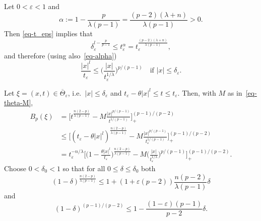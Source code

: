 \documentclass[a4paper, twoside]{article}
\makeatletter
\theoremstyle{propositional}
\theoremstyle{descriptive}
\renewenvironment{proof}[1][\proofname]{\par
  \pushQED{\qed}%
  \normalfont
  \trivlist
  \item[\hskip\labelsep
        \itshape
    #1\@addpunct{.}]\ignorespaces
}{%
  \popQED\endtrivlist\@endpefalse
}
\numberwithin{equation}{section}
\newcommand{\eps}{\varepsilon}
\newcommand{\al}{\alpha}
\newcommand{\de}{\delta}
\newcommand{\la}{\lambda}
\makeatother
\begin{document}
\begin{proof}
Let $0 <\eps<1$ and 
\begin{equation}   \label{eq-alpha}
\al := 1-\frac{p}{\la(p-1)} = \frac{(p-2)(\la+n)}{\la (p-1)} >0.
\end{equation}
Then \eqref{eq-t_eps} implies that
\begin{equation}    \label{eq-t-eps-de-eps}
\de_\eps^{l-\frac{p}{p-1}}
\le t_\eps^\al =  t_\eps^{\frac{(p-2)(\la+n)}{\la(p-1)}},
\end{equation}
and therefore (using also~\eqref{eq-alpha})
\begin{equation}   \label{eq-choose-small-|x|}
\frac{|x|^l}{t_\eps} 
\le \biggl( \frac{|x|}{t_\eps^{1/\la}} \biggr)^{p/(p-1)}
\quad \text{if } |x| \le \de_\eps.
\end{equation}

Let $\xi=(x,t)\in \overline{\Theta}_\eps$, i.e.\ $|x| \le \de_\eps$
and $t_\eps-\theta |x|^l\le t \le t_\eps$. 
Then, with $M$ as in~\eqref{eq-theta-M},
\begin{align}
B_p(\xi) & =  \biggl[ t^{\frac{n(2-p)}{\la (p-1)}} - M
\frac{|x|^{p/(p-1)}}{t^{1/(p-1)}}\biggr]_{+}^{(p-1)/(p-2)}  \nonumber\\
& \le  \biggl[ (t_\eps - \theta|x|^l)^{\frac{n(2-p)}{\la (p-1)}} - 
M \frac{|x|^{p/(p-1)}}{t_\eps^{1/(p-1)}}   \biggr]_{+}^{(p-1)/(p-2)} \nonumber  \\
&= t_\eps^{-n/\la} \biggl[ \biggl(1-\frac{\theta |x|^l}{t_\eps}\biggr)^{\frac{n(2-p)}{\la (p-1)}} 
  - M \biggl( \frac{|x|}{t_\eps^{1/\la}} \biggr)^{p/(p-1)}\biggr]_{+}^{(p-1)/(p-2)}.
\label{eq-Bp1}
\end{align}
Choose $0<\de_0<1$ so that for all $0\le \de \le \de_0$ both
\begin{equation} \label{eq-1}
(1-\de)^{\frac{n(2-p)}{\la (p-1)}} \le 1+(1+\eps(p-2))
\frac{n(p-2)}{\la (p-1)} \de
\end{equation}
and 
\begin{equation} \label{eq-2} 
(1-\de)^{(p-1)/(p-2)} \le 1-\frac{(1-\eps)(p-1)}{p-2} \de.
\end{equation}


\end{proof}
\end{document}
